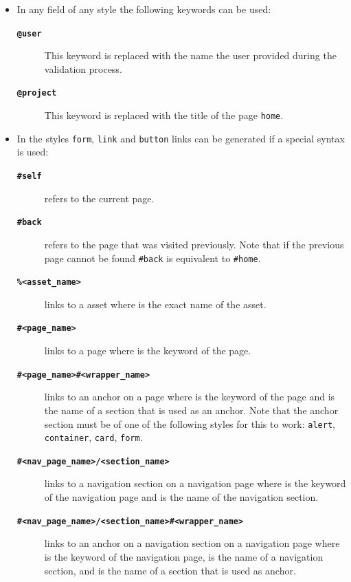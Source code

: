 \documentclass[a4paper,oneside]{book}
\begin{document}
\begin{itemize}
    \item In any field of any style the following keywords can be used:
        \begin{description}
            \item[\textbf{\texttt{@user}}] This keyword is replaced with the name the user provided during the validation process.
            \item[\textbf{\texttt{@project}}] This keyword is replaced with the title of the page \texttt{home}.
        \end{description}
    \item In the styles \texttt{form}, \texttt{link} and \texttt{button} links can be generated if a special syntax is used:
        \begin{description}
            \item[\textbf{\texttt{\#self}}] refers to the current page.
            \item[\textbf{\texttt{\#back}}] refers to the page that was visited previously.
                Note that if the previous page cannot be found \texttt{\#back} is equivalent to \texttt{\#home}.
            \item[\textbf{\texttt{\%<asset\_name>}}] links to a asset where  is the exact name of the asset.
            \item[\textbf{\texttt{\#<page\_name>}}] links to a page where  is the keyword of the page.
            \item[\textbf{\texttt{\#<page\_name>\#<wrapper\_name>}}] links to an anchor on a page where  is the keyword of the page and  is the name of a section that is used as an anchor.
                Note that the anchor section must be of one of the following styles for this to work: \texttt{alert}, \texttt{container}, \texttt{card}, \texttt{form}.
            \item[\textbf{\texttt{\#<nav\_page\_name>/<section\_name>}}] links to a navigation section on a navigation page where  is the keyword of the navigation page and  is the name of the navigation section.
            \item[\textbf{\texttt{\#<nav\_page\_name>/<section\_name>\#<wrapper\_name>}}] links to an anchor on a navigation section on a navigation page where  is the keyword of the navigation page,  is the name of a navigation section, and  is the name of a section that is used as anchor.

\end{description}
\end{itemize}
\end{document}
